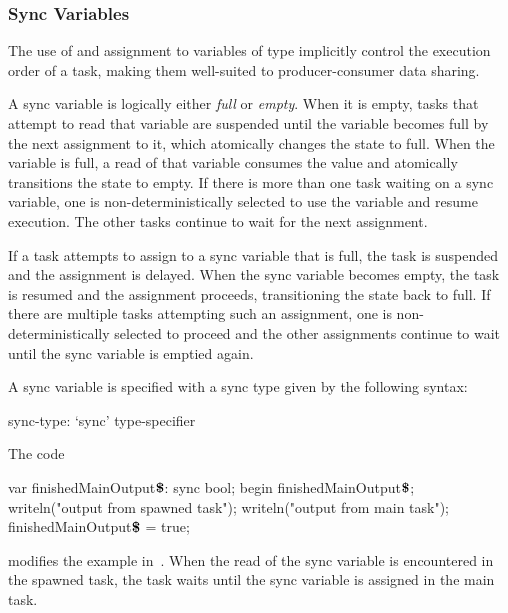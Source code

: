 \subsubsection{Sync Variables}
\label{Sync_Variables}

The use of and assignment to variables of  type implicitly
control the execution order of a task, making them well-suited to
producer-consumer data sharing.

A sync variable is logically either {\em full} or {\em empty}.  When
it is empty, tasks that attempt to read that variable are suspended
until the variable becomes full by the next assignment to it, which
atomically changes the state to full.  When the variable is full, a
read of that variable consumes the value and atomically transitions
the state to empty.  If there is more than one task waiting on a sync
variable, one is non-deterministically selected to use the variable
and resume execution.  The other tasks continue to wait for the next
assignment.

If a task attempts to assign to a sync variable that is full, the task
is suspended and the assignment is delayed.  When the sync variable
becomes empty, the task is resumed and the assignment proceeds,
transitioning the state back to full.  If there are multiple tasks
attempting such an assignment, one is non-deterministically selected
to proceed and the other assignments continue to wait until the sync
variable is emptied again.

A sync variable is specified with a sync type given by the following
syntax:
\begin{syntax}
sync-type:
  `sync' type-specifier
\end{syntax}

\begin{example}
The code
\begin{chapel}
var finishedMainOutput$\mbox{{\bf \$}}$: sync bool;
begin {
  finishedMainOutput$\mbox{{\bf \$}}$;
  writeln("output from spawned task");
}
writeln("output from main task");
finishedMainOutput$\mbox{{\bf \$}}$ = true;
\end{chapel}
modifies the example in~.  When the read of the sync
variable is encountered in the spawned task, the task waits until the
sync variable is assigned in the main task.
\end{example}

